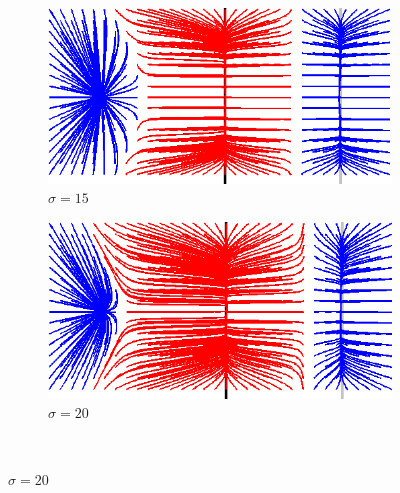 \begin{figure}[!h]
   \begin{subfigure}[c]{.5\linewidth}
     \centering
     \includegraphics[width=\textwidth]{Chapters/Images/m2_sigma_15.png}
     \caption{$\sigma=15$}
   \end{subfigure}   
   \begin{subfigure}[c]{.5\linewidth}
     \centering
     \includegraphics[width=\textwidth]{Chapters/Images/m2_sigma_20.png}
     \caption{$\sigma=20$}
   \end{subfigure}\\
   

\end{figure}
